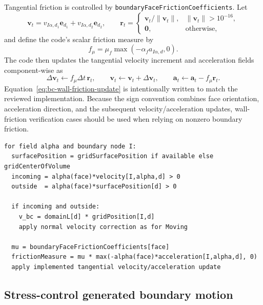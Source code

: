 Tangential friction is controlled by \texttt{boundaryFaceFrictionCoefficients}.  Let
\begin{equation}
  \mathbf{v}_t = v_{I\alpha,d_1}\mathbf{e}_{d_1}+v_{I\alpha,d_2}\mathbf{e}_{d_2},
  \qquad
  \mathbf{r}_t = \begin{cases}
    \mathbf{v}_t/\lVert\mathbf{v}_t\rVert, & \lVert\mathbf{v}_t\rVert>10^{-16},\\
    \mathbf{0}, & \text{otherwise},
  \end{cases}
\end{equation}
and define the code's scalar friction measure by
\begin{equation}
  f_\mu = \mu_f\max\left(-\alpha_f a_{I\alpha,d},0\right).
  \label{eq:bc-wall-friction-scalar}
\end{equation}
The code then updates the tangential velocity increment and acceleration fields component-wise as
\begin{equation}
  \Delta\mathbf{v}_t \leftarrow f_\mu\Delta t\,\mathbf{r}_t,
  \qquad
  \mathbf{v}_t \leftarrow \mathbf{v}_t+\Delta\mathbf{v}_t,
  \qquad
  \mathbf{a}_t \leftarrow \mathbf{a}_t-f_\mu\mathbf{r}_t.
  \label{eq:bc-wall-friction-update}
\end{equation}
Equation~\eqref{eq:bc-wall-friction-update} is intentionally written to match the reviewed implementation.  Because the sign convention combines face orientation, acceleration direction, and the subsequent velocity/acceleration updates, wall-friction verification cases should be used when relying on nonzero boundary friction.

\begin{lstlisting}[caption={Contact-face wall update.}]
for field alpha and boundary node I:
  surfacePosition = gridSurfacePosition if available else gridCenterOfVolume
  incoming = alpha(face)*velocity[I,alpha,d] > 0
  outside  = alpha(face)*surfacePosition[d] > 0

  if incoming and outside:
    v_bc = domainL[d] * gridPosition[I,d]
    apply normal velocity correction as for Moving

  mu = boundaryFaceFrictionCoefficients[face]
  frictionMeasure = mu * max(-alpha(face)*acceleration[I,alpha,d], 0)
  apply implemented tangential velocity/acceleration update
\end{lstlisting}

\subsection{Stress-control generated boundary motion}
\label{subsec:bc-stress-control-internals}

